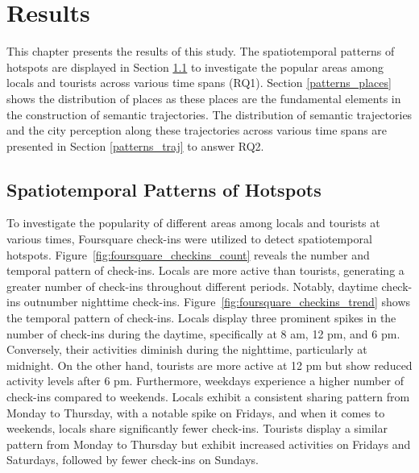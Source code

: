 \documentclass{article}
\theoremstyle{remark}
\begin{document}
\clearpage

\section{Results}
This chapter presents the results of this study. The spatiotemporal patterns of hotspots are displayed in Section \ref{patterns_hotspots} to investigate the popular areas among locals and tourists across various time spans (RQ1). Section \ref{patterns_places} shows the distribution of places as these places are the fundamental elements in the construction of semantic trajectories. The distribution of semantic trajectories and the city perception along these trajectories across various time spans are presented in Section \ref{patterns_traj} to answer RQ2.

\subsection{Spatiotemporal Patterns of Hotspots} \label{patterns_hotspots}

To investigate the popularity of different areas among locals and tourists at various times, Foursquare check-ins were utilized to detect spatiotemporal hotspots. Figure~\ref{fig:foursquare_checkins_count} reveals the number and temporal pattern of check-ins. Locals are more active than tourists, generating a greater number of check-ins throughout different periods. Notably, daytime check-ins outnumber nighttime check-ins. Figure~\ref{fig:foursquare_checkins_trend} shows the temporal pattern of check-ins. Locals display three prominent spikes in the number of check-ins during the daytime, specifically at 8 am, 12 pm, and 6 pm. Conversely, their activities diminish during the nighttime, particularly at midnight. On the other hand, tourists are more active at 12 pm but show reduced activity levels after 6 pm. Furthermore, weekdays experience a higher number of check-ins compared to weekends. Locals exhibit a consistent sharing pattern from Monday to Thursday, with a notable spike on Fridays, and when it comes to weekends, locals share significantly fewer check-ins. Tourists display a similar pattern from Monday to Thursday but exhibit increased activities on Fridays and Saturdays, followed by fewer check-ins on Sundays.
\end{document}
